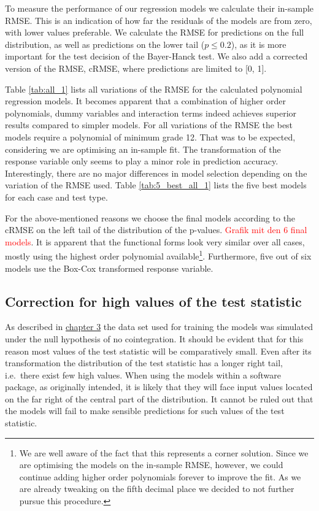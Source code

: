 \documentclass[12pt,a4paper]{article}
\let\rmarkdownfootnote\footnote%
\def\footnote{\protect\rmarkdownfootnote}
\begin{document}
To measure the performance of our regression models we calculate their
in-sample RMSE. This is an indication of how far the residuals of the
models are from zero, with lower values preferable. We calculate the
RMSE for predictions on the full distribution, as well as predictions on
the lower tail (\(p \leq 0.2\)), as it is more important for the test
decision of the Bayer-Hanck test. We also add a corrected version of the
RMSE, cRMSE, where predictions are limited to {[}0, 1{]}.

Table \ref{tab:all_1} lists all variations of the RMSE for the
calculated polynomial regression models. It becomes apparent that a
combination of higher order polynomials, dummy variables and interaction
terms indeed achieves superior results compared to simpler models. For
all variations of the RMSE the best models require a polynomial of
minimum grade 12. That was to be expected, considering we are optimising
an in-sample fit. The transformation of the response variable only seems
to play a minor role in prediction accuracy. Interestingly, there are no
major differences in model selection depending on the variation of the
RMSE used. Table \ref{tab:5_best_all_1} lists the five best models for
each case and test type.

For the above-mentioned reasons we choose the final models according to
the cRMSE on the left tail of the distribution of the p-values.
\textcolor{red}{Grafik mit den 6 final models}. It is apparent that the
functional forms look very similar over all cases, mostly using the
highest order polynomial available\footnote{We are well aware of the
  fact that this represents a corner solution. Since we are optimising
  the models on the in-sample RMSE, however, we could continue adding
  higher order polynomials forever to improve the fit. As we are already
  tweaking on the fifth decimal place we decided to not further pursue
  this procedure.}. Furthermore, five out of six models use the Box-Cox
transformed response variable.

\hypertarget{correction-for-high-values-of-the-test-statistic}{%
\subsection{Correction for high values of the test
statistic}\label{correction-for-high-values-of-the-test-statistic}}

As described in \protect\hyperlink{Simulation}{chapter 3} the data set
used for training the models was simulated under the null hypothesis of
no cointegration. It should be evident that for this reason most values
of the test statistic will be comparatively small. Even after its
transformation the distribution of the test statistic has a longer right
tail, i.e.~there exist few high values. When using the models within a
software package, as originally intended, it is likely that they will
face input values located on the far right of the central part of the
distribution. It cannot be ruled out that the models will fail to make
sensible predictions for such values of the test statistic.
\end{document}
